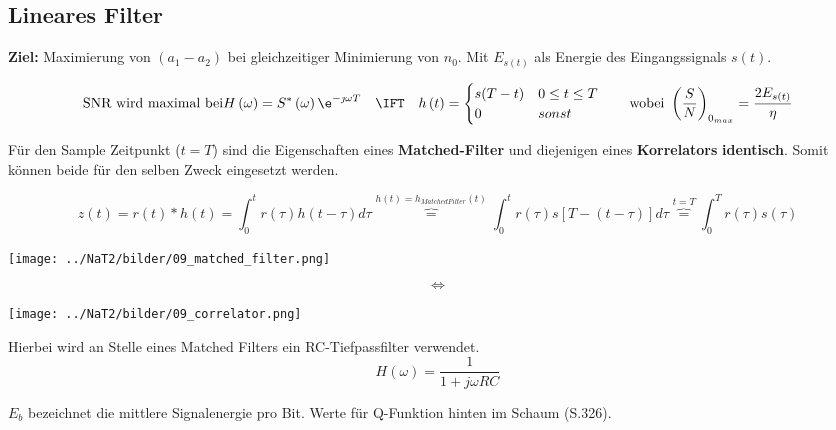 \subsection{Lineares Filter}
 \label{09_matched_filter}
	\textbf{Ziel: } Maximierung von $(a_1 - a_2)$ bei gleichzeitiger Minimierung
	von $n_0$. Mit $E_{s(t)}$ als Energie des Eingangssignals $s(t)$.
 
	$$\text{SNR wird maximal bei} H \left( \omega \right) = S^* \left( \omega
	\right) \e^{-\jmath \omega T} \quad \IFT \quad h \left( t \right) = 
	\begin{cases} s(T-t) & 0 \leq t \leq T \\
	0 & sonst\end{cases} \qquad \text{wobei } \left(\dfrac{S}{N}\right)_{0_{max}} =
	\dfrac{2E_{s(t)}}{\eta}$$
 	

 \label{09_korrelator}
Für den Sample Zeitpunkt ($t=T$) sind die Eigenschaften eines \textbf{Matched-Filter} und diejenigen eines
\textbf{Korrelators} \textbf{identisch}. Somit können beide für den selben Zweck eingesetzt werden.

$$ z(t) = r(t) \ast h(t) = \int_0^t r(\tau) h(t-\tau) d\tau \overbrace{=}^{h(t) =
h_{MatchedFilter}(t)} \int_0^t r(\tau) s[T - (t - \tau)] d\tau \overbrace{=}^{t = T} \int_0^T
r(\tau)s(\tau)$$

	\begin{center}
		\begin{minipage}[c]{4.5cm}
			\texttt{[image: ../NaT2/bilder/09\_matched\_filter.png]}
		\end{minipage}
		\begin{minipage}[c]{2cm}		
			$$\Longleftrightarrow $$
		\end{minipage}
		\begin{minipage}[c]{4.5cm}
			\texttt{[image: ../NaT2/bilder/09\_correlator.png]}
		\end{minipage}
	\end{center}

Hierbei wird an Stelle eines Matched Filters ein RC-Tiefpassfilter verwendet. \\
$$H(\omega) = \dfrac{1}{1 + j \omega R C}$$

\label{09_binary_signals_error}
$E_b$ bezeichnet die mittlere Signalenergie pro Bit. Werte für Q-Funktion hinten im Schaum (S.326).

